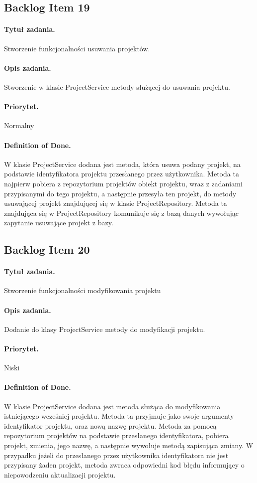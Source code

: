 \documentclass[a4paper]{article}
\begin{document}
\subsection{Backlog Item 19} 
\paragraph{Tytuł zadania.}  Stworzenie funkcjonalności usuwania projektów.
\paragraph{Opis zadania.} Stworzenie w klasie ProjectService metody służącej do usuwania projektu. 
\paragraph{Priorytet.} Normalny
\paragraph{Definition of Done.} W klasie ProjectService dodana jest metoda, która usuwa podany projekt, na podstawie identyfikatora projektu przesłanego 
przez użytkownika. Metoda ta najpierw pobiera z repozytorium projektów obiekt projektu, wraz z zadaniami przypisanymi do tego projektu, a następnie przesyła ten projekt, do metody usuwającej projekt znajdującej się w klasie ProjectRepository. Metoda ta znajdująca się w ProjectRepository komunikuje się z bazą danych wywołując zapytanie usuwające projekt z bazy. 

\subsection{Backlog Item 20} 
\paragraph{Tytuł zadania.} Stworzenie funkcjonalności modyfikowania projektu
\paragraph{Opis zadania.} Dodanie do klasy ProjectService metody do modyfikacji projektu.
\paragraph{Priorytet.} Niski
\paragraph{Definition of Done.} W klasie ProjectService dodana jest metoda służąca do modyfikowania istniejącego wcześniej projektu. Metoda ta przyjmuje jako swoje argumenty identyfikator projektu, oraz nową nazwę projektu. Metoda za pomocą repozytorium projektów na podstawie przesłanego identyfikatora, pobiera projekt, zmienia, jego nazwę, a następnie wywołuje metodą zapisująca zmiany. W przypadku jeżeli do przesłanego przez użytkownika identyfikatora nie jest przypisany żaden projekt, metoda zwraca odpowiedni kod błędu informujący o niepowodzeniu aktualizacji projektu.
\end{document}
